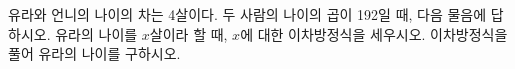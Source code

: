유라와 언니의 나이의 차는 4살이다. 두 사람의 나이의 곱이 192일 때, 다음 물음에 답하시오.
 유라의 나이를 $x$살이라 할 때, $x$에 대한 이차방정식을 세우시오.
 이차방정식을 풀어 유라의 나이를 구하시오.
